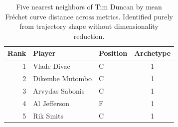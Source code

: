 \begin{table}[htbp]
  \centering\small
  \begin{tabular}{rllc}
    \toprule
    Rank & Player & Position & Archetype \\
    \midrule
    1 & Vlade Divac & C & 1 \\
    2 & Dikembe Mutombo & C & 1 \\
    3 & Arvydas Sabonis & C & 1 \\
    4 & Al Jefferson & F & 1 \\
    5 & Rik Smits & C & 1 \\
    \bottomrule
  \end{tabular}
  \caption{Five nearest neighbors of Tim Duncan by mean Fr\'{e}chet curve distance across metrics. Identified purely from trajectory shape without dimensionality reduction.}
  \label{tab:Tim_Duncan_frechet_curve_neighbors}
\end{table}

